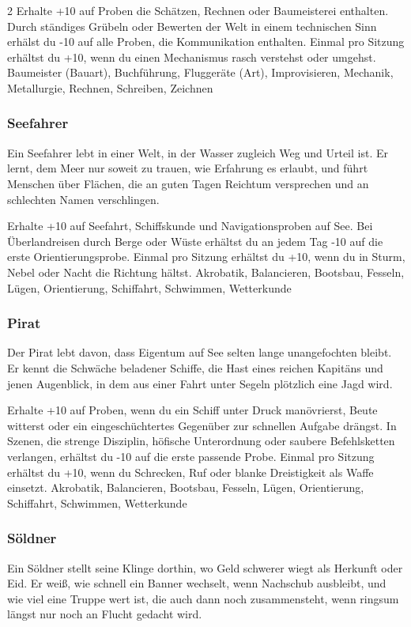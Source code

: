 {\begin{multicols*}{2}
        \wegespielwertebox
        {Erhalte +10 auf Proben die Schätzen, Rechnen oder Baumeisterei enthalten.}
        {Durch ständiges Grübeln oder Bewerten der Welt in einem technischen Sinn erhälst du -10 auf alle Proben, die Kommunikation enthalten.}
        {Einmal pro Sitzung erhältst du +10, wenn du einen Mechanismus rasch verstehst oder umgehst.}
        {Baumeister (Bauart), Buchführung, Fluggeräte (Art), Improvisieren, Mechanik, Metallurgie, Rechnen, Schreiben, Zeichnen}

        \subsubsection*{Seefahrer}
        Ein Seefahrer lebt in einer Welt, in der Wasser zugleich Weg und Urteil ist. Er lernt, dem Meer nur soweit zu trauen, wie Erfahrung es erlaubt, und führt Menschen über Flächen, die an guten Tagen Reichtum versprechen und an schlechten Namen verschlingen.

        \wegespielwertebox
        {Erhalte +10 auf Seefahrt, Schiffskunde und Navigationsproben auf See.}
        {Bei Überlandreisen durch Berge oder Wüste erhältst du an jedem Tag -10 auf die erste Orientierungsprobe.}
        {Einmal pro Sitzung erhältst du +10, wenn du in Sturm, Nebel oder Nacht die Richtung hältst.}
        {Akrobatik, Balancieren, Bootsbau, Fesseln, Lügen, Orientierung, Schiffahrt, Schwimmen, Wetterkunde}

        \subsubsection*{Pirat}
        Der Pirat lebt davon, dass Eigentum auf See selten lange unangefochten bleibt. Er kennt die Schwäche beladener Schiffe, die Hast eines reichen Kapitäns und jenen Augenblick, in dem aus einer Fahrt unter Segeln plötzlich eine Jagd wird.

        \wegespielwertebox
        {Erhalte +10 auf Proben, wenn du ein Schiff unter Druck manövrierst, Beute witterst oder ein eingeschüchtertes Gegenüber zur schnellen Aufgabe drängst.}
        {In Szenen, die strenge Disziplin, höfische Unterordnung oder saubere Befehlsketten verlangen, erhältst du -10 auf die erste passende Probe.}
        {Einmal pro Sitzung erhältst du +10, wenn du Schrecken, Ruf oder blanke Dreistigkeit als Waffe einsetzt.}
        {Akrobatik, Balancieren, Bootsbau, Fesseln, Lügen, Orientierung, Schiffahrt, Schwimmen, Wetterkunde}

        \subsubsection*{Söldner}
        Ein Söldner stellt seine Klinge dorthin, wo Geld schwerer wiegt als Herkunft oder Eid. Er weiß, wie schnell ein Banner wechselt, wenn Nachschub ausbleibt, und wie viel eine Truppe wert ist, die auch dann noch zusammensteht, wenn ringsum längst nur noch an Flucht gedacht wird.


\end{multicols*}}
